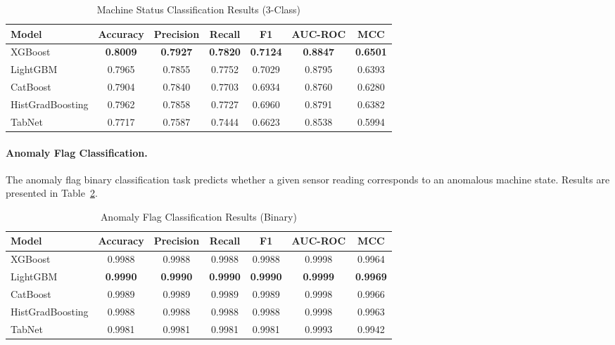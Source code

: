\begin{table}[htbp]
\centering
\caption{Machine Status Classification Results (3-Class)}
\label{tab:cls_machine_status}
\begin{tabular}{lcccccc}
\hline
\textbf{Model} & \textbf{Accuracy} & \textbf{Precision} & \textbf{Recall} & \textbf{F1} & \textbf{AUC-ROC} & \textbf{MCC} \\
\hline
XGBoost              & \textbf{0.8009} & \textbf{0.7927} & \textbf{0.7820} & \textbf{0.7124} & \textbf{0.8847} & \textbf{0.6501} \\
LightGBM             & 0.7965 & 0.7855 & 0.7752 & 0.7029 & 0.8795 & 0.6393 \\
CatBoost             & 0.7904 & 0.7840 & 0.7703 & 0.6934 & 0.8760 & 0.6280 \\
HistGradBoosting     & 0.7962 & 0.7858 & 0.7727 & 0.6960 & 0.8791 & 0.6382 \\
TabNet               & 0.7717 & 0.7587 & 0.7444 & 0.6623 & 0.8538 & 0.5994 \\
\hline
\end{tabular}
\end{table}

\paragraph{Anomaly Flag Classification.} The anomaly flag binary classification task predicts whether a given sensor reading corresponds to an anomalous machine state. Results are presented in Table~\ref{tab:cls_anomaly_flag}.

\begin{table}[htbp]
\centering
\caption{Anomaly Flag Classification Results (Binary)}
\label{tab:cls_anomaly_flag}
\begin{tabular}{lcccccc}
\hline
\textbf{Model} & \textbf{Accuracy} & \textbf{Precision} & \textbf{Recall} & \textbf{F1} & \textbf{AUC-ROC} & \textbf{MCC} \\
\hline
XGBoost              & 0.9988 & 0.9988 & 0.9988 & 0.9988 & 0.9998 & 0.9964 \\
LightGBM             & \textbf{0.9990} & \textbf{0.9990} & \textbf{0.9990} & \textbf{0.9990} & \textbf{0.9999} & \textbf{0.9969} \\
CatBoost             & 0.9989 & 0.9989 & 0.9989 & 0.9989 & 0.9998 & 0.9966 \\
HistGradBoosting     & 0.9988 & 0.9988 & 0.9988 & 0.9988 & 0.9998 & 0.9963 \\
TabNet               & 0.9981 & 0.9981 & 0.9981 & 0.9981 & 0.9993 & 0.9942 \\
\hline
\end{tabular}
\end{table}

